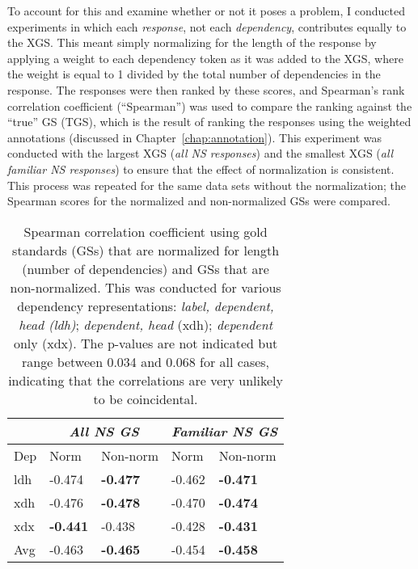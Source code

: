 
To account for this and examine whether or not it poses a problem, I conducted experiments in which each \textit{response}, not each \textit{dependency}, contributes equally to the XGS. This meant simply normalizing for the length of the response by applying a weight to each dependency token as it was added to the XGS, where the weight is equal to 1 divided by the total number of dependencies in the response. The responses were then ranked by these scores, and Spearman's rank correlation coefficient (``Spearman'') was used to compare the ranking against the ``true'' GS (TGS), which is the result of ranking the responses using the weighted annotations (discussed in Chapter~\ref{chap:annotation}). This experiment was conducted with the largest XGS (\textit{all NS responses}) and the smallest XGS (\textit{all familiar NS responses}) to ensure that the effect of normalization is consistent.  This process was repeated for the same data sets without the normalization; the Spearman scores for the normalized and non-normalized GSs were compared.

\begin{table}[htb!]
\begin{center}
\begin{tabular}{|l||l|l||l|l|}
\hline
 & \multicolumn{2}{|c||}{\textit{All NS GS}} & \multicolumn{2}{|c|}{\textit{Familiar NS GS}} \\
\hline
 Dep & Norm & Non-norm & Norm & Non-norm \\
\hline
\hline
ldh & -0.474 & \textbf{-0.477} & -0.462 & \textbf{-0.471} \\
\hline
xdh & -0.476 & \textbf{-0.478} & -0.470 & \textbf{-0.474} \\
\hline
xdx & \textbf{-0.441} & -0.438 & -0.428 & \textbf{-0.431} \\
\hline
Avg & -0.463 & \textbf{-0.465} & -0.454 & \textbf{-0.458} \\
\hline
\end{tabular}
\caption{\label{tab:normalize-responses-spearman} Spearman correlation coefficient using gold standards (GSs) that are normalized for length (number of dependencies) and GSs that are non-normalized. This was conducted for various dependency representations: \textit{label, dependent, head (ldh)}; \textit{dependent, head} (xdh); \textit{dependent} only (xdx). The p-values are not indicated but range between 0.034 and 0.068 for all cases, indicating that the correlations are very unlikely to be coincidental.}
\end{center}
\end{table}

